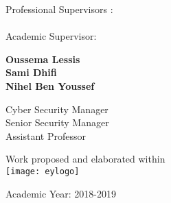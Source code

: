 \vskip1cm%
\begin{center}
\begin{minipage}[c]{0.29\columnwidth}
Professional Supervisors :\\
\\
Academic Supervisor:
\end{minipage}
\hfill
\begin{minipage}[c]{0.29\columnwidth}
\textbf{Oussema Lessis}\\
\textbf{Sami Dhifi}\\
\textbf{Nihel Ben Youssef}
\end{minipage}
\hfill
\begin{minipage}[c]{0.29\columnwidth}
Cyber Security Manager \\
Senior Security Manager \\
Assistant Professor
\end{minipage}
\end{center}
\vskip1cm
\begin{center}
{Work proposed and elaborated within}\\
\vskip1cm
\texttt{[image: eylogo]}\\
\end{center}
\vskip1cm%
\begin{center}
{\textrm{Academic Year: 2018-2019}}\\
\end{center}
\vfill
\newpage




% 